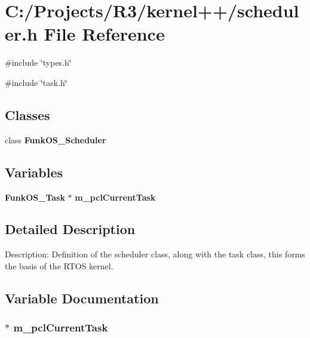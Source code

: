 \section{C:/Projects/R3/kernel++/scheduler.h File Reference}
\label{scheduler_8h}
{\ttfamily \#include \char`\"{}types.h\char`\"{}}\par
{\ttfamily \#include \char`\"{}task.h\char`\"{}}\par
\subsection*{Classes}
\begin{DoxyCompactItemize}
\item 
class {\bf FunkOS\_\-Scheduler}
\end{DoxyCompactItemize}
\subsection*{Variables}
\begin{DoxyCompactItemize}
\item 
{\bf FunkOS\_\-Task} $\ast$ {\bf m\_\-pclCurrentTask}
\end{DoxyCompactItemize}


\subsection{Detailed Description}
Description: Definition of the scheduler class, along with the task class, this forms the basis of the RTOS kernel. 

\subsection{Variable Documentation}
\subsubsection[{m\_\-pclCurrentTask}]{$\ast$ {\bf m\_\-pclCurrentTask}}\label{scheduler_8h_ab36c9eec14f859acb1d9a9505b09a8dc}
